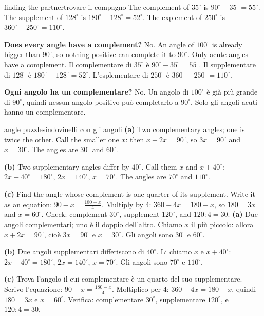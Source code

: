 \documentclass[10pt,a4paper,oneside]{book}
\begin{document}
\begin{example}{finding the partner}{trovare il compagno}
The complement of $35^\circ$ is $90^\circ - 35^\circ = 55^\circ$. The supplement of $128^\circ$ is $180^\circ - 128^\circ = 52^\circ$. The explement of $250^\circ$ is $360^\circ - 250^\circ = 110^\circ$.

\textbf{Does every angle have a complement?} No. An angle of $100^\circ$ is already bigger than $90^\circ$, so nothing positive can complete it to $90^\circ$. Only acute angles have a complement.
\tcblower
Il complementare di $35^\circ$ è $90^\circ - 35^\circ = 55^\circ$. Il supplementare di $128^\circ$ è $180^\circ - 128^\circ = 52^\circ$. L'esplementare di $250^\circ$ è $360^\circ - 250^\circ = 110^\circ$.

\textbf{Ogni angolo ha un complementare?} No. Un angolo di $100^\circ$ è già più grande di $90^\circ$, quindi nessun angolo positivo può completarlo a $90^\circ$. Solo gli angoli acuti hanno un complementare.
\end{example}

\begin{example}{angle puzzles}{indovinelli con gli angoli}
\textbf{(a)} Two complementary angles; one is twice the other. Call the smaller one $x$: then $x + 2x = 90^\circ$, so $3x = 90^\circ$ and $x = 30^\circ$. The angles are $30^\circ$ and $60^\circ$.

\textbf{(b)} Two supplementary angles differ by $40^\circ$. Call them $x$ and $x + 40^\circ$: $2x + 40^\circ = 180^\circ$, $2x = 140^\circ$, $x = 70^\circ$. The angles are $70^\circ$ and $110^\circ$.

\textbf{(c)} Find the angle whose complement is one quarter of its supplement. Write it as an equation: $90 - x = \frac{180 - x}{4}$. Multiply by 4: $360 - 4x = 180 - x$, so $180 = 3x$ and $x = 60^\circ$. Check: complement $30^\circ$, supplement $120^\circ$, and $120 : 4 = 30$.
\tcblower
\textbf{(a)} Due angoli complementari; uno è il doppio dell'altro. Chiamo $x$ il più piccolo: allora $x + 2x = 90^\circ$, cioè $3x = 90^\circ$ e $x = 30^\circ$. Gli angoli sono $30^\circ$ e $60^\circ$.

\textbf{(b)} Due angoli supplementari differiscono di $40^\circ$. Li chiamo $x$ e $x + 40^\circ$: $2x + 40^\circ = 180^\circ$, $2x = 140^\circ$, $x = 70^\circ$. Gli angoli sono $70^\circ$ e $110^\circ$.

\textbf{(c)} Trova l'angolo il cui complementare è un quarto del suo supplementare. Scrivo l'equazione: $90 - x = \frac{180 - x}{4}$. Moltiplico per 4: $360 - 4x = 180 - x$, quindi $180 = 3x$ e $x = 60^\circ$. Verifica: complementare $30^\circ$, supplementare $120^\circ$, e $120 : 4 = 30$.
\end{example}
\end{document}
